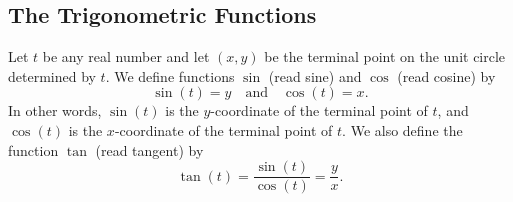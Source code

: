 \documentclass[letterpaper,12pt,oneside]{book}
\theoremstyle{definition}
\begin{document}
{\begin{center}
\end{center}

\subsection*{The Trigonometric Functions}

Let $t$ be any real number and let $(x,y)$ be the terminal point on the unit circle determined by $t$.  We define functions $\sin$ (read sine) and $\cos$ (read cosine) by
\[
\sin(t)=y \ \ \ \mbox{ and } \ \ \ \cos(t)=x.
\]
In other words, $\sin(t)$ is the $y$-coordinate of the terminal point of $t$, and $\cos(t)$ is the $x$-coordinate of the terminal point of $t$.  We also define the function $\tan$ (read tangent) by
\[
\tan(t)=\frac{\sin(t)}{\cos(t)}=\frac{y}{x}.
\]

}
\end{document}
